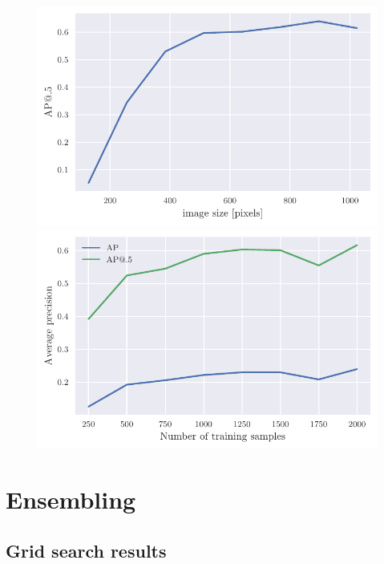 \begin{figure}
    \begin{floatrow}[2]
        \includegraphics[width=0.5\linewidth]{images/img_size_dependency.pdf}\qquad
        \includegraphics[width=0.5\linewidth]{images/training_set_dependency.pdf}\qquad
    \end{floatrow}
\end{figure}

\section{Ensembling}
\subsection{Grid search results}



